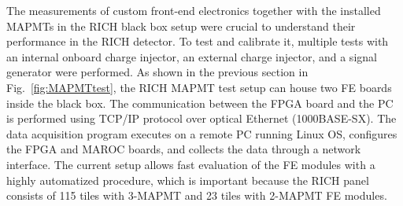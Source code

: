 The measurements of custom front-end electronics together with the installed MAPMTs in the RICH black box setup were crucial to understand their performance in the RICH detector.
To test and calibrate it, multiple tests with an internal onboard charge injector, an external charge injector, and a signal generator were performed.
As shown in the previous section in Fig.~\ref{fig:MAPMTtest}, the RICH MAPMT test setup can house two FE boards inside the black box.
The communication between the FPGA board and the PC is performed using TCP/IP protocol over optical Ethernet (1000BASE-SX).
The data acquisition program executes on a remote PC running Linux OS, configures the FPGA and MAROC boards, and collects the data through a network interface.
The current setup allows fast evaluation of the FE modules with a highly automatized procedure, which is important because the RICH panel consists of 115 tiles with 3-MAPMT and 23 tiles with 2-MAPMT FE modules.
